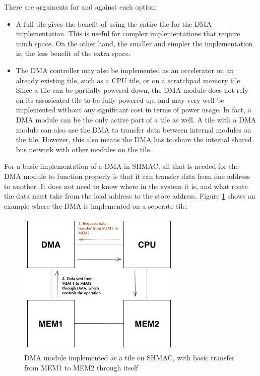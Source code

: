 There are arguments for and against each option:
\begin{itemize}
    \item A full tile gives the benefit of using the entire tile for the DMA implementation.
    This is useful for complex implementations that require much space.
    On the other hand, the smaller and simpler the implementation is, the less benefit of the extra space.
    \item The DMA controller may also be implemented as an accelerator on an already existing tile, such as a CPU tile, or on a scratchpad memory tile.
    Since a tile can be partially powered down, the DMA module does not rely on its assosicated tile to be fully powered up, and may very well be implemented without any significant cost in terms of power usage.
    In fact, a DMA module can be the only active part of a tile as well.
    A tile with a DMA module can also use the DMA to transfer data between internal modules on the tile.
    However, this also means the DMA has to share the internal shared bus network with other modules on the tile.
\end{itemize}

For a basic implementation of a DMA in SHMAC, all that is needed for the DMA module to function properly is that it can transfer data from one address to another.
It does not need to know where in the system it is, and what route the data must take from the load address to the store address.
Figure \ref{fig:DMASHMAC1} shows an example where the DMA is implemented on a seperate tile.

\begin{figure}[h!]
    \centering
    \includegraphics[width=0.7\textwidth]{Figures/DMA/DMASHMAC1}
    \caption{DMA module implemented as a tile on SHMAC, with basic transfer from MEM1 to MEM2 through itself}
    \label{fig:DMASHMAC1}
\end{figure}
 
